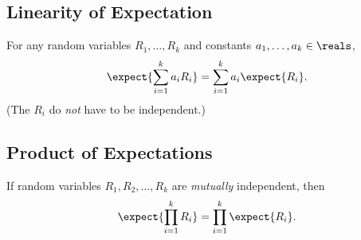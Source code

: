 \documentclass[handout]{mcs}
\begin{document}
{\subsection*{Linearity of Expectation}
For any random variables $R_1, \dots, R_k$ and constants $a_1, \dots, a_k
\in \reals$,
\[
\expect{\sum_{i=1}^k a_iR_i} = \sum_{i=1}^k a_i\expect{R_i}.
\]
(The $R_i$ do \emph{not} have to be independent.)

\subsection*{Product of Expectations} If random
variables $R_1, R_2, \dots, R_k$ are \emph{mutually} independent, then
\[
\expect{\prod_{i=1}^k R_i} = \prod_{i=1}^k \expect{R_i}.
\]
}
\end{document}
